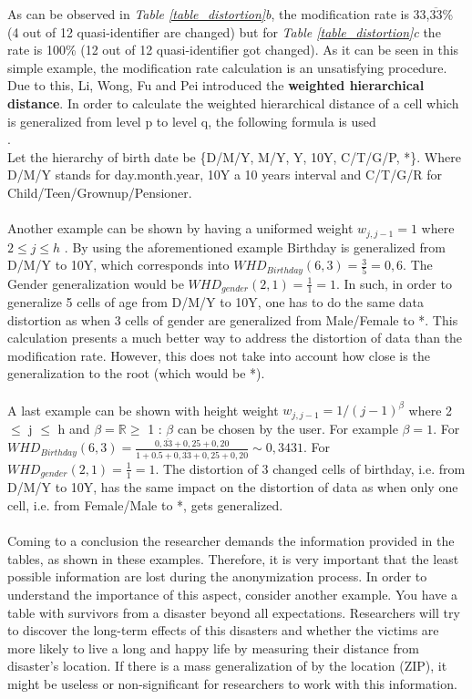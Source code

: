 \documentclass{llncs}
\newcommand{\R}{\mathbb{R}}
\begin{document}
As can be observed in \textit{Table \ref{table_distortion}b}, the modification rate is  33,$\overline{33}$\% (4 out of 12 quasi-identifier are changed) but for \textit{Table \ref{table_distortion}c} the rate is 100\% (12 out of 12 quasi-identifier got changed). As it can be seen in this simple example, the modification rate calculation is an unsatisfying procedure. Due to this, Li, Wong, Fu and Pei introduced the \textbf{weighted hierarchical distance}. In order to calculate the weighted hierarchical distance of a cell which is generalized from level p to level q, the following formula is used\\
\cite{li2006achieving}.\\
Let the hierarchy of birth date be \{D/M/Y, M/Y, Y, 10Y, C/T/G/P, *\}. Where D/M/Y  stands for day.month.year, 10Y a 10 years interval and C/T/G/R for Child/Teen/Grownup/Pensioner.
\\\\
Another example can be shown by having a uniformed weight $w_{j,j-1} = 1$ where $2\leq j \leq h$ \cite{li2006achieving}. By using the aforementioned example Birthday is generalized from D/M/Y to 10Y, which corresponds into $WHD_{Birthday}(6,3) = \frac{3}{5} = 0,6$. 
The Gender generalization would be $WHD_{gender}(2,1) = \frac{1}{1} = 1$. In such, in order to generalize 5 cells of age from D/M/Y to 10Y, one has to do the same data distortion as when 3 cells of gender are generalized from Male/Female to *. This calculation presents a much better way to address the distortion of data than the modification rate. However, this does not take into account how close is the generalization to the root (which would be *).\\\\
A last example can be shown with height weight $w_{j,j-1} = 1 / (j-1)^{\beta}$ where 2 $\leq$ j $\leq$ h and $\beta = \R \geq$ 1 \cite{li2006achieving}:
$\beta$ can be chosen by the user. For example $\beta = 1$. For $WHD_{Birthday}(6,3) = \frac{0,\overline{33}+0,25+0,20}{1+0.5+0,\overline{33}+0,25+0,20} \sim 0,3431$. For $WHD_{gender}(2,1) = \frac{1}{1} = 1$. The distortion of 3 changed cells of birthday, i.e. from D/M/Y to 10Y, has the same impact on the distortion of data as when only one cell, i.e. from Female/Male to *, gets generalized.\\\\
Coming to a conclusion the researcher demands the information provided in the tables, as shown in these examples. Therefore, it is very important that the least possible information are lost during the anonymization process. In order to understand the importance of this aspect, consider another example. You have a table with survivors from a disaster beyond all expectations. Researchers will try to discover the long-term effects of this disasters and whether the victims are more likely to live a long and happy life by measuring their distance from disaster’s location. If there is a mass generalization of by the location (ZIP), it might be useless or non-significant for researchers to work with this information.
\end{document}
